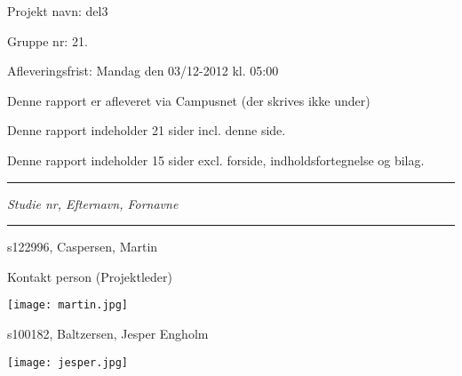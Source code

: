 
{\normalsize

\noindent Projekt navn: del3

\noindent Gruppe nr: 21.

\noindent Afleveringsfrist: Mandag den 03/12-2012 kl. 05:00

\noindent Denne rapport er afleveret via Campusnet (der skrives ikke under)

\noindent Denne rapport indeholder 21 sider incl. denne side.

\noindent Denne rapport indeholder 15 sider excl. forside, indholdsfortegnelse og bilag.
}
\fancybreak{}
\noindent \emph{Studie nr, Efternavn, Fornavne}
\fancybreak{}

\noindent s122996, Caspersen, Martin

\noindent Kontakt person (Projektleder)

\noindent \texttt{[image: martin.jpg]}

\noindent s100182, Baltzersen, Jesper Engholm

\noindent \texttt{[image: jesper.jpg]}